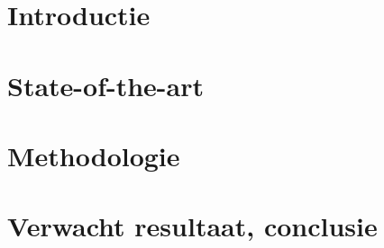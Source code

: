 
\section{Introductie}%
\label{sec:introductie}




\section{State-of-the-art}%
\label{sec:state-of-the-art}



\section{Methodologie}%
\label{sec:methodologie}


\section{Verwacht resultaat, conclusie}%
\label{sec:verwachte_resultaten}

